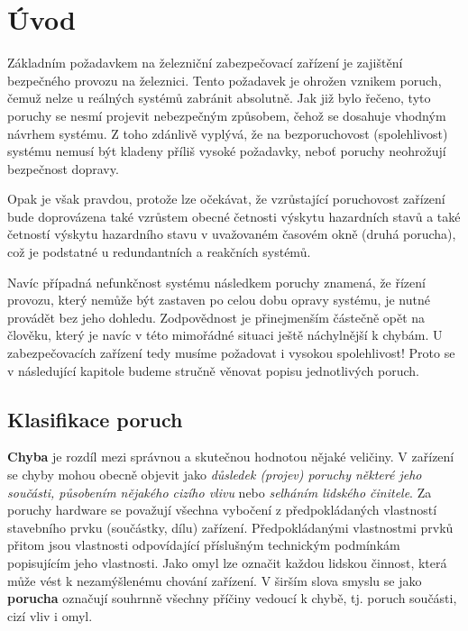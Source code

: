 \chapter{Úvod}
\minitoc

  Základním požadavkem na železniční zabezpečovací zařízení je zajištění bezpečného provozu na 
  železnici. Tento požadavek je ohrožen vznikem poruch, čemuž nelze u reálných systémů zabránit 
  absolutně. Jak již bylo řečeno, tyto poruchy se nesmí projevit nebezpečným způsobem, čehož se 
  dosahuje vhodným návrhem systému. Z toho zdánlivě vyplývá, že na bezporuchovost (spolehlivost) 
  systému nemusí být kladeny příliš vysoké požadavky, neboť poruchy neohrožují bezpečnost dopravy.  

  Opak je však pravdou, protože lze očekávat, že vzrůstající poruchovost zařízení bude doprovázena 
  také vzrůstem obecné četnosti výskytu hazardních stavů a také četností výskytu hazardního stavu v 
  uvažovaném časovém okně (druhá porucha), což je podstatné u redundantních a reakčních systémů.
  
  Navíc případná nefunkčnost systému následkem poruchy znamená, že řízení provozu, který nemůže být 
  zastaven po celou dobu opravy systému, je nutné provádět bez jeho dohledu. Zodpovědnost je 
  přinejmenším částečně opět na člověku, který je navíc v této mimořádné situaci ještě náchylnější 
  k chybám. U zabezpečovacích zařízení tedy musíme požadovat i vysokou spolehlivost! Proto se v 
  následující kapitole budeme stručně věnovat popisu jednotlivých poruch.
  
  \section{Klasifikace poruch}
    \textbf{Chyba} je rozdíl mezi správnou a skutečnou hodnotou nějaké veličiny. V zařízení se 
    chyby mohou obecně objevit jako \emph{důsledek (projev) poruchy některé jeho součásti, 
    působením nějakého cizího vlivu} nebo \emph{selháním lidského činitele}. Za poruchy hardware se 
    považují všechna vybočení z předpokládaných vlastností stavebního prvku (součástky, dílu) 
    zařízení. Předpokládanými vlastnostmi prvků přitom jsou vlastnosti odpovídající příslušným 
    technickým podmínkám popisujícím jeho vlastnosti. Jako omyl lze označit každou lidskou činnost, 
    která může vést k nezamýšlenému chování zařízení. V širším slova smyslu se jako 
    \textbf{porucha} označují souhrnně všechny příčiny vedoucí k chybě, tj. poruch součásti, 
    cizí vliv i omyl.
      
